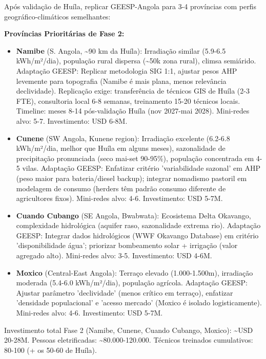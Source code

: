 \documentclass[12pt, a4paper]{article}
\begin{document}
Após validação de Huíla, replicar GEESP-Angola para 3-4 províncias com perfis geográfico-climáticos semelhantes:

\textbf{Províncias Prioritárias de Fase 2:}
\begin{itemize}
\item \textbf{Namibe} (S. Angola, \textasciitilde{}90 km da Huíla): Irradiação similar (5.9-6.5 kWh/m²/dia), população rural dispersa (\textasciitilde{}50k zona rural), climsa semiárido. Adaptação GEESP: Replicar metodologia SIG 1:1, ajustar pesos AHP levemente para topografia (Namibe é mais plana, menos relevância declividade). Replicação exige: transferência de técnicos GIS de Huíla (2-3 FTE), consultoria local 6-8 semanas, treinamento 15-20 técnicos locais. Timeline: meses 8-14 pós-validação Huíla (nov 2027-mai 2028). Mini-redes alvo: 5-7. Investimento: USD 6-8M.

\item \textbf{Cunene} (SW Angola, Kunene region): Irradiação excelente (6.2-6.8 kWh/m²/dia, melhor que Huíla em alguns meses), sazonalidade de precipitação pronunciada (seco mai-set 90-95\%), população concentrada em 4-5 vilas. Adaptação GEESP: Enfatizar critério 'variabilidade sazonal' em AHP (peso maior para bateria/diesel backup); integrar nomadismo pastoril em modelagem de consumo (herders têm padrão consumo diferente de agricultores fixos). Mini-redes alvo: 4-6. Investimento: USD 5-7M.

\item \textbf{Cuando Cubango} (SE Angola, Bwabwata): Ecosistema Delta Okavango, complexidade hidrológica (aquifer raso, sazonalidade extrema rio). Adaptação GEESP: Integrar dados hidrológicos (WWF Okavango Database) em critério 'disponibilidade água'; priorizar bombeamento solar + irrigação (valor agregado alto). Mini-redes alvo: 3-5. Investimento: USD 4-6M.

\item \textbf{Moxico} (Central-East Angola): Terraço elevado (1.000-1.500m), irradiação moderada (5.4-6.0 kWh/m²/dia), população agrícola. Adaptação GEESP: Ajustar parâmetro 'declividade' (menos crítico em terraço), enfatizar 'densidade populacional' e 'acesso mercado' (Moxico é isolado logisticamente). Mini-redes alvo: 4-6. Investimento: USD 5-7M.
\end{itemize}

Investimento total Fase 2 (Namibe, Cunene, Cuando Cubango, Moxico): \textasciitilde{}USD 20-28M. Pessoas eletrificadas: \textasciitilde{}80.000-120.000. Técnicos treinados cumulativos: 80-100 (+ os 50-60 de Huíla).
\end{document}

